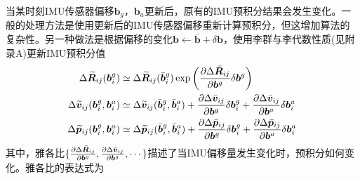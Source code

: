 当某时刻IMU传感器偏移$\boldsymbol{b}_g$，$\boldsymbol{b}_a$更新后，原有的IMU预积分结果会发生变化。一般的处理方法是使用更新后的IMU传感器偏移重新计算预积分，但这增加算法的复杂性。另一种做法是根据偏移的变化$\boldsymbol{b} \leftarrow \bar{\boldsymbol{b}}+\delta \boldsymbol{b}$，使用李群与李代数性质(见附录A)更新IMU预积分值
\begin{equation}
\label{equ5.25}
\begin{aligned}
\Delta \widetilde{\boldsymbol{R}}_{ij}(\boldsymbol{b}_i^g) &\simeq  \Delta \widetilde{\boldsymbol{R}}_{ij}(\bar{\boldsymbol{b}}_i^g) \exp \left( { \partial \Delta \bar{\boldsymbol{R}}_{ij} \over \partial \boldsymbol{b}^g } \delta \boldsymbol{b}^g \right) 
\\
\Delta \widetilde{\boldsymbol{v}}_{ij}(\boldsymbol{b}_i^g,\boldsymbol{b}_i^a) &\simeq \Delta \widetilde{\boldsymbol{v}}_{ij}(\bar{\boldsymbol{b}}_i^g,\bar{\boldsymbol{b}}_i^a) + { \partial \Delta \bar{\boldsymbol{v}}_{ij} \over \partial \boldsymbol{b}^g } \delta \boldsymbol{b}_i^g + { \partial \Delta \bar{\boldsymbol{v}}_{ij} \over \partial \boldsymbol{b}^a } \delta \boldsymbol{b}_i^a 				
\\
\Delta \widetilde{\boldsymbol{p}}_{ij}(\boldsymbol{b}_i^g,\boldsymbol{b}_i^a) &\simeq \Delta \widetilde{\boldsymbol{p}}_{ij}(\bar{\boldsymbol{b}}_i^g,\bar{\boldsymbol{b}}_i^a) + { \partial \Delta \bar{\boldsymbol{p}}_{ij} \over \partial \boldsymbol{b}^g } \delta \boldsymbol{b}_i^g + { \partial \Delta \bar{\boldsymbol{p}}_{ij} \over \partial \boldsymbol{b}^a } \delta \boldsymbol{b}_i^a 	
\end{aligned}
\end{equation}
其中，雅各比$\{ { \partial \Delta \bar{\boldsymbol{R}}_{ij} \over \partial \boldsymbol{b}^g },{ \partial \Delta \bar{\boldsymbol{v}}_{ij} \over \partial \boldsymbol{b}^g }, \cdots \} $描述了当IMU偏移量发生变化时，预积分如何变化。雅各比的表达式为
